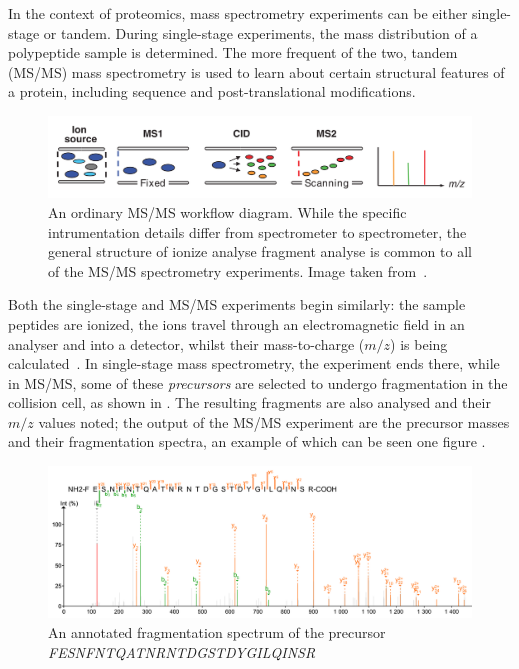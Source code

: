 In the context of proteomics, mass spectrometry experiments can be either single-stage or tandem. During single-stage experiments, the mass distribution of a polypeptide sample is determined. The more frequent of the two, tandem (MS/MS) mass spectrometry is used to learn about certain structural features of a protein, including sequence and post-translational modifications.

\begin{figure}
  \centering
  \includegraphics[width=.9\linewidth]{img/msms-workflow.png}
  \caption{An ordinary MS/MS workflow diagram. While the specific intrumentation details differ from spectrometer to spectrometer, the general structure of ionize \textrightarrow{} analyse \textrightarrow{} fragment \textrightarrow{} analyse is common to all of the MS/MS spectrometry experiments. Image taken from~\citet{domon2006mass}.}\label{fig:mass-spectrometry-workflow}
\end{figure}

Both the single-stage and MS/MS experiments begin similarly: the sample peptides are ionized, the ions travel through an electromagnetic field in an analyser and into a detector, whilst their mass-to-charge (\(m/z\)) is being calculated~\cite{gross2006mass}. In single-stage mass spectrometry, the experiment ends there, while in MS/MS, some of these \emph{precursors} are selected to undergo fragmentation in the collision cell, as shown in . The resulting fragments are also analysed and their \(m/z\) values noted; the output of the MS/MS experiment are the precursor masses and their fragmentation spectra, an example of which can be seen one figure .

\begin{figure}
  \centering
  \includegraphics[width=1\linewidth]{img/fragmentation-spectrum.png}
  \caption{An annotated fragmentation spectrum of the precursor \emph{FESNFNTQATNRNTDGSTDYGILQINSR}}\label{fig:frag-spectrum}
\end{figure}

